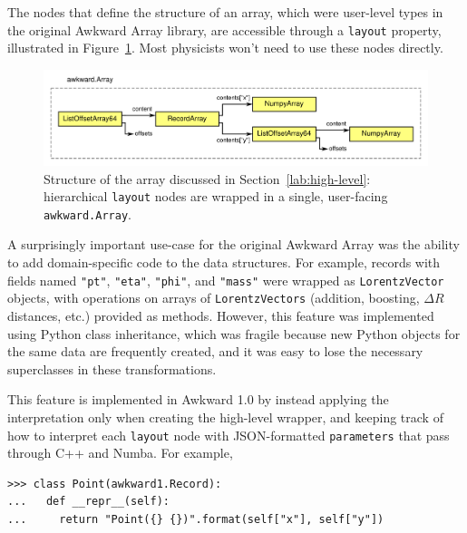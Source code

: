 \documentclass{webofc}
\begin{document}
The nodes that define the structure of an array, which were user-level types in the original Awkward Array library, are accessible through a \texttt{layout} property, illustrated in Figure~\ref{fig:example-hierarchy}. Most physicists won't need to use these nodes directly.

\begin{figure}
\begin{center}
\includegraphics[width=\linewidth]{example-hierarchy.pdf}
\end{center}

\vspace{-0.25 cm}
\caption{Structure of the array discussed in Section~\ref{lab:high-level}: hierarchical \texttt{layout} nodes are wrapped in a single, user-facing \texttt{awkward.Array}. \label{fig:example-hierarchy}}
\end{figure}

A surprisingly important use-case for the original Awkward Array was the ability to add domain-specific code to the data structures. For example, records with fields named \texttt{"pt"}, \texttt{"eta"}, \texttt{"phi"}, and \texttt{"mass"} were wrapped as \texttt{LorentzVector} objects, with operations on arrays of \texttt{LorentzVectors} (addition, boosting, $\Delta R$ distances, etc.) provided as methods. However, this feature was implemented using Python class inheritance, which was fragile because new Python objects for the same data are frequently created, and it was easy to lose the necessary superclasses in these transformations.

This feature is implemented in Awkward 1.0 by instead applying the interpretation only when creating the high-level wrapper, and keeping track of how to interpret each \texttt{layout} node with JSON-formatted \texttt{parameters} that pass through C++ and Numba. For example,

\begin{verbatim}
>>> class Point(awkward1.Record):
...   def __repr__(self):
...     return "Point({} {})".format(self["x"], self["y"])
\end{verbatim}
\end{document}
